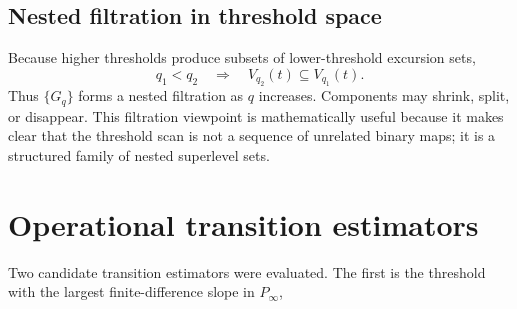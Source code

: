 \documentclass[11pt]{article}
\begin{document}
\subsection{Nested filtration in threshold space}
Because higher thresholds produce subsets of lower-threshold excursion sets,
\[
q_1<q_2 \quad\Longrightarrow\quad V_{q_2}(t)\subseteq V_{q_1}(t).
\]
Thus $\{G_q\}$ forms a nested filtration as $q$ increases. Components may shrink, split, or disappear. This filtration viewpoint is mathematically useful because it makes clear that the threshold scan is not a sequence of unrelated binary maps; it is a structured family of nested superlevel sets.

\section{Operational transition estimators}
Two candidate transition estimators were evaluated. The first is the threshold with the largest finite-difference slope in $P_\infty$,
\end{document}
